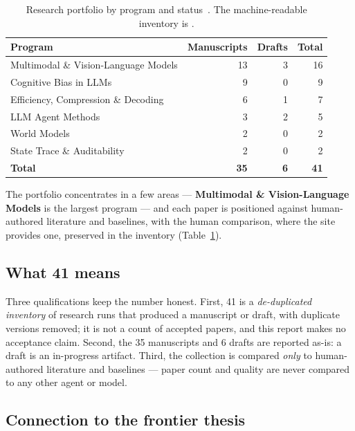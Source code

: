 \begin{table}[H]
\centering
\small
\begin{tabularx}{\linewidth}{@{}X r r r@{}}
\toprule
\textbf{Program} & \textbf{Manuscripts} & \textbf{Drafts} & \textbf{Total} \\
\midrule
Multimodal \& Vision-Language Models & 13 & 3 & 16 \\
Cognitive Bias in LLMs               &  9 & 0 &  9 \\
Efficiency, Compression \& Decoding  &  6 & 1 &  7 \\
LLM Agent Methods                    &  3 & 2 &  5 \\
World Models                         &  2 & 0 &  2 \\
State Trace \& Auditability          &  2 & 0 &  2 \\
\midrule
\textbf{Total}                       & \textbf{35} & \textbf{6} & \textbf{41} \\
\bottomrule
\end{tabularx}
\caption{Research portfolio by program and status~\cite{argus_research}. The
machine-readable inventory is
.}
\label{tab:portfolio}
\end{table}

The portfolio concentrates in a few areas --- \textbf{Multimodal \& Vision-Language
Models} is the largest program --- and each paper is positioned against human-authored
literature and baselines, with the human comparison, where the site provides one,
preserved in the inventory (Table~\ref{tab:portfolio}).

\subsection{What 41 means}

Three qualifications keep the number honest. First, 41 is a \emph{de-duplicated
inventory} of research runs that produced a manuscript or draft, with duplicate
versions removed; it is not a count of accepted papers, and this report makes no
acceptance claim. Second, the 35 manuscripts and 6 drafts are reported as-is: a draft
is an in-progress artifact. Third, the collection is compared \emph{only} to
human-authored literature and baselines --- paper count and quality are never compared
to any other agent or model.

\subsection{Connection to the frontier thesis}

